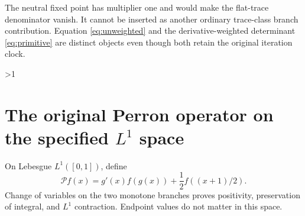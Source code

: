 \documentclass[10pt]{article}
\newcommand{\PP}{\mathcal P}
\begin{document}
The neutral fixed point has multiplier one and would make the flat-trace
denominator vanish. It cannot be inserted as another ordinary trace-class
branch contribution. Equation \eqref{eq:unweighted} and the derivative-weighted
determinant \eqref{eq:primitive} are distinct objects even though both retain
the original iteration clock.
\fi

\ifnum\CRevisionRound>1
\newpage
\section{The original Perron operator on the specified \texorpdfstring{$L^1$}{L1} space}
On Lebesgue $L^1([0,1])$, define
\begin{equation}
\PP f(x)=g'(x)f(g(x))+\frac12 f((x+1)/2).
\label{eq:perron}
\end{equation}
Change of variables on the two monotone branches proves positivity,
preservation of integral, and $L^1$ contraction. Endpoint values do not
matter in this space.
\end{document}
